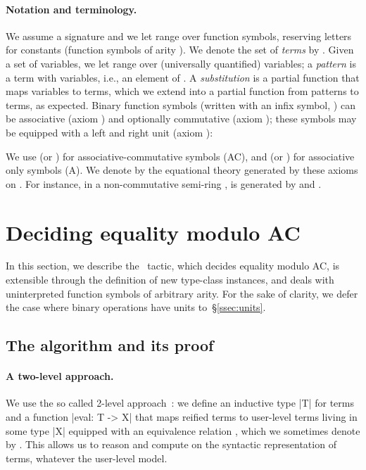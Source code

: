 \documentclass{llncs}
\begin{document}
\paragraph{Notation and terminology.} 

We assume a signature  and we let  range over
function symbols, reserving letters  for constants
(function symbols of arity ). We denote the set of \emph{terms} by
.
Given a set  of variables, we let  range over
(universally quantified) variables; a \emph{pattern} is a term with
variables, i.e., an element of .
A \emph{substitution}  is a partial function that maps
variables to terms, which we extend into a partial function from
patterns to terms, as expected.
Binary function symbols (written with an infix symbol, ) can
be associative (axiom ) and optionally commutative (axiom );
these symbols may be equipped with a left and right unit  (axiom
):

We use  (or ) for associative-commutative symbols (AC), and
 (or ) for associative only symbols (A).
We denote by  the equational theory generated by these axioms
on . For instance, in a non-commutative semi-ring
,  is generated by  and
.

\section{Deciding equality modulo AC}
\label{sec:decision}

In this section, we describe the \tac\ tactic, which decides equality
modulo AC, is extensible through the definition of new type-class
instances, and deals with uninterpreted function symbols of arbitrary
arity.
For the sake of clarity, we defer the case where binary operations have
units to~\S\ref{ssec:units}.

\subsection{The algorithm and its proof}
\label{ssec:coqalgo}

\paragraph{A two-level approach.}  

We use the so called 2-level approach~\cite{barthe-barendregt-95}: we
define an inductive type \coqinline|T| for terms and a function
\coqinline|eval: T -> X| that maps reified terms to user-level terms
living in some type \coqinline|X| equipped with an equivalence
relation , which we sometimes denote by . This allows
us to reason and compute on the syntactic representation of terms,
whatever the user-level model.
\end{document}
